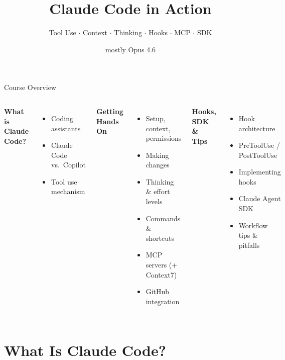 \documentclass[aspectratio=169]{beamer}
\title{Claude Code in Action}
\subtitle{Tool Use $\cdot$ Context $\cdot$ Thinking $\cdot$ Hooks $\cdot$ MCP $\cdot$ SDK}
\author{mostly Opus 4.6}
\date{}
\begin{document}
\begin{frame}
\titlepage
\end{frame}

\begin{frame}{Course Overview}
\begin{columns}[T]
\textbf{\color{popblue}What is Claude Code?}
\begin{itemize}
  \item Coding assistants
  \item Claude Code vs.\ Copilot
  \item Tool use mechanism
\end{itemize}

\textbf{\color{paramgreen}Getting Hands On}
\begin{itemize}
  \item Setup, context, permissions
  \item Making changes
  \item Thinking \& effort levels
  \item Commands \& shortcuts
  \item MCP servers (+ Context7)
  \item GitHub integration
\end{itemize}

\textbf{\color{violet1}Hooks, SDK \& Tips}
\begin{itemize}
  \item Hook architecture
  \item PreToolUse / PostToolUse
  \item Implementing hooks
  \item Claude Agent SDK
  \item Workflow tips \& pitfalls
\end{itemize}
\end{columns}
\end{frame}

\section{What Is Claude Code?}
\end{document}
